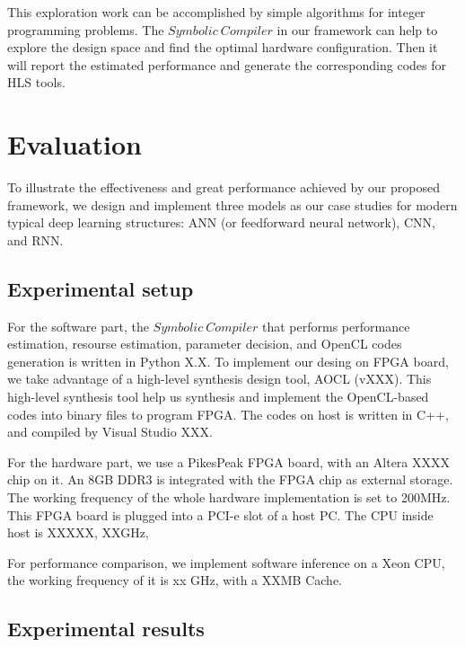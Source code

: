 \documentclass{acm_proc_article-sp-copy}
\begin{document}
This exploration work can be accomplished by simple algorithms for integer programming problems. The $Symbolic\ Compiler$ in our framework can help to explore the design space and  find the optimal hardware configuration. Then it will report the estimated performance and generate the corresponding codes for HLS tools.

\section{Evaluation}
To illustrate the effectiveness and great performance achieved by our proposed framework, we design and implement three models as our case studies for modern typical deep learning structures: ANN (or feedforward neural network), CNN, and RNN. 


\subsection{Experimental setup}
For the software part, the $Symbolic\ Compiler$ that performs performance estimation, resourse estimation, parameter decision, and OpenCL codes generation is written in Python X.X. To implement our desing on FPGA board, we take advantage of a high-level synthesis design tool, AOCL (vXXX). This high-level synthesis tool help us synthesis and implement the OpenCL-based codes into binary files to program FPGA. The codes on host is written in C++, and compiled by Visual Studio XXX.

For the hardware part, we use a PikesPeak FPGA board, with an Altera XXXX chip on it. An 8GB DDR3 is integrated with the FPGA chip as external storage. The working  frequency of the whole hardware implementation is set to 200MHz. This FPGA board is plugged into a PCI-e slot of a host PC. The CPU inside host is XXXXX, XXGHz,

For performance comparison, we implement software inference on a Xeon CPU, the working frequency of it is xx GHz, with a XXMB Cache.

\subsection{Experimental results}
\end{document}
